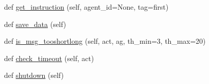 \begin{DoxyCompactItemize}
\item 
def \hyperlink{classprojects_1_1wizard__of__wikipedia_1_1mturk__evaluation__task_1_1worlds_1_1WizardEval_aa58e1bc16ad0db719e00321563c9f45a}{get\+\_\+instruction} (self, agent\+\_\+id=None, tag=\textquotesingle{}first\textquotesingle{})
\item 
def \hyperlink{classprojects_1_1wizard__of__wikipedia_1_1mturk__evaluation__task_1_1worlds_1_1WizardEval_af2db699f6af0f8b441fbf280c5b12302}{save\+\_\+data} (self)
\item 
def \hyperlink{classprojects_1_1wizard__of__wikipedia_1_1mturk__evaluation__task_1_1worlds_1_1WizardEval_ac6b1cd76a8d7270fb0d879c2ec77abf5}{is\+\_\+msg\+\_\+tooshortlong} (self, act, ag, th\+\_\+min=3, th\+\_\+max=20)
\item 
def \hyperlink{classprojects_1_1wizard__of__wikipedia_1_1mturk__evaluation__task_1_1worlds_1_1WizardEval_a49e222b755af51462cba1320eadc4f53}{check\+\_\+timeout} (self, act)
\item 
def \hyperlink{classprojects_1_1wizard__of__wikipedia_1_1mturk__evaluation__task_1_1worlds_1_1WizardEval_aac0d10bb35f7764c2649773815969a5b}{shutdown} (self)
\end{DoxyCompactItemize}
